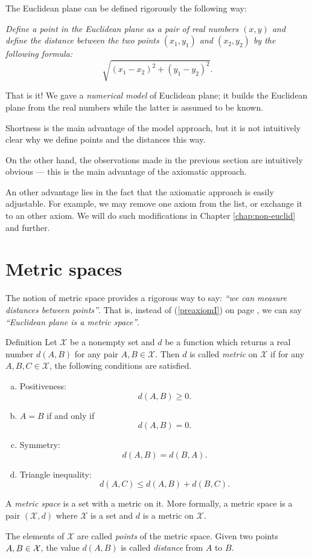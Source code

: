 The Euclidean plane can be defined rigorously the following way:

{}\emph{Define a {}\emph{point} in the Euclidean plane as a pair of real numbers $(x,y)$ and define the {}\emph{distance} between the two points $(x_1,y_1)$ and $(x_2,y_2)$ by the following formula:}
\[\sqrt{(x_1-x_2)^2+(y_1-y_2)^2}.\]

That is it!
We gave a {}\emph{numerical model} of Euclidean plane;
it builds the Euclidean plane from the real numbers
while the latter is assumed to be known.

Shortness is the main advantage of the model approach,
but it is not intuitively clear why we define points and the distances this way.

On the other hand, the observations made in the previous section are  intuitively obvious ---
this is the main advantage of the axiomatic approach.

An other advantage lies in the fact that the axiomatic approach is easily adjustable. 
For example, we may remove one axiom from the list,
or exchange it to an other axiom. 
We will do such modifications in Chapter \ref{chap:non-euclid} and further.

\section*{Metric spaces}

The notion of metric space provides 
a rigorous way to say: {}\emph{``we can measure distances between points''}.
That is, instead of (\ref{preaxiomI}) on page \pageref{preaxiomI},
we can say {}\emph{``Euclidean plane is a metric space''}.

\begin{thm}{Definition}\label{def:metric-space}
Let $\mathcal X$ be a nonempty set and 
$d$ be a function
which returns a real number $d(A,B)$
for any pair $A,B\in\mathcal X$.
Then $d$
is called \emph{metric} on 
$\mathcal X$ if for any
$A,B,C\in \mathcal X$, the following conditions are satisfied.
\begin{enumerate}[(a)]
\item\label{def:metric-space:a} Positiveness: 
$$d(A,B)\ge 0.$$
\item\label{def:metric-space:b}  $A=B$ if and only if 
$$d(A,B)=0.$$
\item\label{def:metric-space:c} Symmetry: $$d(A, B) = d(B, A).$$
\item\label{def:metric-space:d} Triangle inequality: 
$$d(A, C) \le d(A, B) + d(B, C).$$
\end{enumerate}
A \emph{metric space} is a set with a metric on it. 
More formally, a metric space is a pair $(\mathcal X, d)$ where $\mathcal X$ is a set and $d$ is a metric on $\mathcal X$.

The elements of $\mathcal X$ are called \emph{points} of the metric space.
Given two points $A,B\z\in \mathcal X$, 
the value $d(A, B)$ is called \emph{distance} from $A$ to $B$.
\end{thm}


